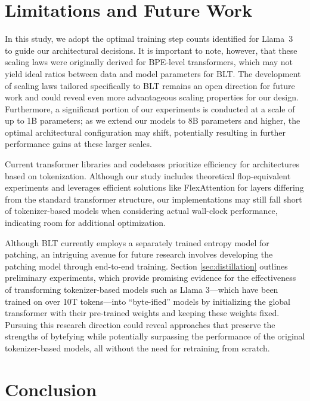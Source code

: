 \section{Limitations and Future Work}

In this study, we adopt the optimal training step counts identified for Llama~3~\citep{dubey2024llama} to guide our architectural decisions. It is important to note, however, that these scaling laws were originally derived for BPE-level transformers, which may not yield ideal ratios between data and model parameters for {\textsc BLT}. The development of scaling laws tailored specifically to {\textsc BLT} remains an open direction for future work and could reveal even more advantageous scaling properties for our design. Furthermore, a significant portion of our experiments is conducted at a scale of up to 1B parameters; as we extend our models to 8B parameters and higher, the optimal architectural configuration may shift, potentially resulting in further performance gains at these larger scales.

Current transformer libraries and codebases prioritize efficiency for architectures based on tokenization. Although our study includes theoretical flop-equivalent experiments and leverages efficient solutions like FlexAttention for layers differing from the standard transformer structure, our implementations may still fall short of tokenizer-based models when considering actual wall-clock performance, indicating room for additional optimization.

Although {\textsc BLT} currently employs a separately trained entropy model for patching, an intriguing avenue for future research involves developing the patching model through end-to-end training. Section \ref{sec:distillation} outlines preliminary experiments, which provide promising evidence for the effectiveness of transforming tokenizer-based models such as Llama 3—which have been trained on over 10T tokens—into ``byte-ified'' models by initializing the global transformer with their pre-trained weights and keeping these weights fixed. Pursuing this research direction could reveal approaches that preserve the strengths of bytefying while potentially surpassing the performance of the original tokenizer-based models, all without the need for retraining from scratch.

\section{Conclusion}
\label{section:conclusion}

